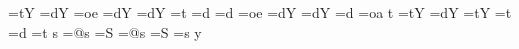 {     \or
      \t@kenbuffer=\expandafter{\the\t@kenbuffer tY}%
     \else \t@kenbuffer=\expandafter{\the\t@kenbuffer dY}%
     \fi%
    \else%
     \ifcase\thisfvs
      \t@kenbuffer=\expandafter{\the\t@kenbuffer oe}%
     \or
      \t@kenbuffer=\expandafter{\the\t@kenbuffer dY}%
     \else \t@kenbuffer=\expandafter{\the\t@kenbuffer dY}%
     \fi%
    \fi
   \else
    \ifpreviousisboundary%
     \ifcase\thisfvs
      \t@kenbuffer=\expandafter{\the\t@kenbuffer t}%
     \or
      \t@kenbuffer=\expandafter{\the\t@kenbuffer d}%
     \else \t@kenbuffer=\expandafter{\the\t@kenbuffer d}%
     \fi%
    \else%
     \iffollowingispseudoboundary
	  \ifcase\thisfvs
       \t@kenbuffer=\expandafter{\the\t@kenbuffer oe}%
      \or
       \t@kenbuffer=\expandafter{\the\t@kenbuffer dY}%
      \else \t@kenbuffer=\expandafter{\the\t@kenbuffer dY}%
      \fi%
     \else
      \iffollowingisvowel
       \t@kenbuffer=\expandafter{\the\t@kenbuffer d}%
      \else
       \t@kenbuffer=\expandafter{\the\t@kenbuffer oa}%
      \fi
     \fi
    \fi
   \fi
  \else \if\thischar t%
   \iffollowingisboundary%
    \ifpreviousisboundary%
     \t@kenbuffer=\expandafter{\the\t@kenbuffer tY}%
    \else%
     \ifcase\thisfvs
      \t@kenbuffer=\expandafter{\the\t@kenbuffer dY}%
     \or
      \t@kenbuffer=\expandafter{\the\t@kenbuffer tY}%
     \fi%
    \fi%
   \else%
    \ifpreviousisboundary%
     \t@kenbuffer=\expandafter{\the\t@kenbuffer t}%
    \else%
     \ifcase\thisfvs 
      \t@kenbuffer=\expandafter{\the\t@kenbuffer d}%
     \or
      \t@kenbuffer=\expandafter{\the\t@kenbuffer t}%
     \fi%
    \fi
   \fi%
  \else \if\thischar s%
   \iffollowingisboundary%
    \ifpreviousisboundary%
     \t@kenbuffer=\expandafter{\the\t@kenbuffer @s}%
    \else%
     \t@kenbuffer=\expandafter{\the\t@kenbuffer S}%
    \fi%
   \else%
    \ifpreviousisboundary%
     \t@kenbuffer=\expandafter{\the\t@kenbuffer @s}%
    \else%
     \iffollowingispseudoboundary
      \t@kenbuffer=\expandafter{\the\t@kenbuffer S}%
     \else
      \t@kenbuffer=\expandafter{\the\t@kenbuffer s}%
     \fi
    \fi
   \fi
  \else \if\thischar y%
   \iffollowingisboundary%
    \ifpreviousisboundary%
}
